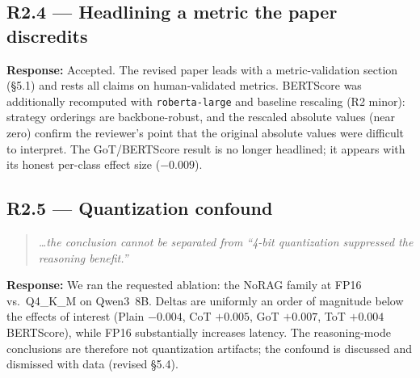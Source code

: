 \documentclass[11pt]{article}
\newcommand{\rcomment}[1]{\begin{quote}\itshape\color{black!70}#1\end{quote}}
\newcommand{\resp}{\noindent\textbf{Response:} }
\begin{document}
\subsection*{R2.4 --- Headlining a metric the paper discredits}
\resp Accepted. The revised paper leads with a metric-validation section (\S5.1) and rests all claims on human-validated metrics. BERTScore was additionally recomputed with \texttt{roberta-large} and baseline rescaling (R2 minor): strategy orderings are backbone-robust, and the rescaled absolute values (near zero) confirm the reviewer's point that the original absolute values were difficult to interpret. The GoT/BERTScore result is no longer headlined; it appears with its honest per-class effect size ($-0.009$).

\subsection*{R2.5 --- Quantization confound}
\rcomment{\dots the conclusion cannot be separated from ``4-bit quantization suppressed the reasoning benefit.''}
\resp We ran the requested ablation: the NoRAG family at FP16 vs.\ Q4\_K\_M on Qwen3~8B. Deltas are uniformly an order of magnitude below the effects of interest (Plain $-0.004$, CoT $+0.005$, GoT $+0.007$, ToT $+0.004$ BERTScore), while FP16 substantially increases latency. The reasoning-mode conclusions are therefore not quantization artifacts; the confound is discussed and dismissed with data (revised \S5.4).
\end{document}
